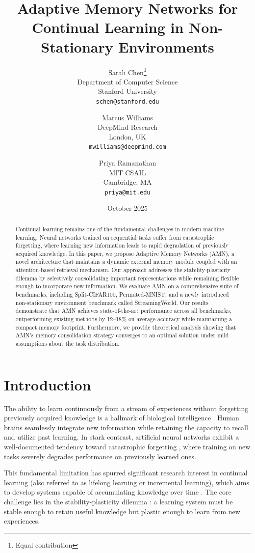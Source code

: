 \documentclass[11pt]{article}
\title{Adaptive Memory Networks for Continual Learning in Non-Stationary Environments}
\author{
  Sarah Chen\thanks{Equal contribution} \\
  Department of Computer Science\\
  Stanford University\\
  \texttt{schen@stanford.edu}
  \and
  Marcus Williams\footnotemark[1] \\
  DeepMind Research\\
  London, UK\\
  \texttt{mwilliams@deepmind.com}
  \and
  Priya Ramanathan \\
  MIT CSAIL\\
  Cambridge, MA\\
  \texttt{priya@mit.edu}
}
\date{October 2025}
\begin{document}
\maketitle

\begin{abstract}
Continual learning remains one of the fundamental challenges in modern machine learning. Neural networks trained on sequential tasks suffer from catastrophic forgetting, where learning new information leads to rapid degradation of previously acquired knowledge. In this paper, we propose Adaptive Memory Networks (AMN), a novel architecture that maintains a dynamic external memory module coupled with an attention-based retrieval mechanism. Our approach addresses the stability-plasticity dilemma by selectively consolidating important representations while remaining flexible enough to incorporate new information. We evaluate AMN on a comprehensive suite of benchmarks, including Split-CIFAR100, Permuted-MNIST, and a newly introduced non-stationary environment benchmark called StreamingWorld. Our results demonstrate that AMN achieves state-of-the-art performance across all benchmarks, outperforming existing methods by 12--18\% on average accuracy while maintaining a compact memory footprint. Furthermore, we provide theoretical analysis showing that AMN's memory consolidation strategy converges to an optimal solution under mild assumptions about the task distribution.
\end{abstract}

\section{Introduction}
\label{sec:introduction}

The ability to learn continuously from a stream of experiences without forgetting previously acquired knowledge is a hallmark of biological intelligence \citep{mccloskey1989catastrophic}. Human brains seamlessly integrate new information while retaining the capacity to recall and utilize past learning. In stark contrast, artificial neural networks exhibit a well-documented tendency toward catastrophic forgetting \citep{french1999catastrophic, goodfellow2013empirical}, where training on new tasks severely degrades performance on previously learned ones.

This fundamental limitation has spurred significant research interest in continual learning (also referred to as lifelong learning or incremental learning), which aims to develop systems capable of accumulating knowledge over time \citep{parisi2019continual, delange2021continual}. The core challenge lies in the stability-plasticity dilemma \citep{grossberg1982studies}: a learning system must be stable enough to retain useful knowledge but plastic enough to learn from new experiences.
\end{document}

